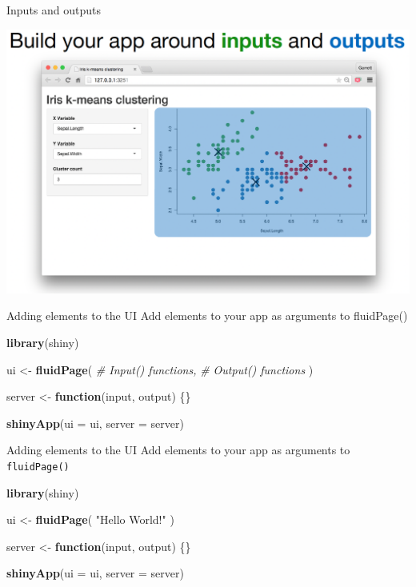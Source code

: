\documentclass[
  ignorenonframetext,
]{beamer}
\newenvironment{Shaded}{\begin{snugshade}}{\end{snugshade}}
\newcommand{\AttributeTok}[1]{\textcolor[rgb]{0.13,0.29,0.53}{#1}}
\newcommand{\CommentTok}[1]{\textcolor[rgb]{0.56,0.35,0.01}{\textit{#1}}}
\newcommand{\ControlFlowTok}[1]{\textcolor[rgb]{0.13,0.29,0.53}{\textbf{#1}}}
\newcommand{\FunctionTok}[1]{\textcolor[rgb]{0.13,0.29,0.53}{\textbf{#1}}}
\newcommand{\NormalTok}[1]{#1}
\newcommand{\OtherTok}[1]{\textcolor[rgb]{0.56,0.35,0.01}{#1}}
\newcommand{\StringTok}[1]{\textcolor[rgb]{0.31,0.60,0.02}{#1}}
\begin{document}
\begin{frame}{Inputs and outputs}
\label{inputs-and-outputs-1}
\center

\includegraphics{shinyfigs/shiny_in_out_1.png}
\end{frame}

\begin{frame}[fragile]{Adding elements to the UI}
\label{adding-elements-to-the-ui}
Add elements to your app as arguments to fluidPage()

\begin{Shaded}
\begin{Highlighting}[]
\FunctionTok{library}\NormalTok{(shiny)}

\NormalTok{ui }\OtherTok{\textless{}{-}} \FunctionTok{fluidPage}\NormalTok{(}
    \CommentTok{\# Input() functions,}
    \CommentTok{\# Output() functions}
\NormalTok{    )}

\NormalTok{server }\OtherTok{\textless{}{-}} \ControlFlowTok{function}\NormalTok{(input, output) \{\}}

\FunctionTok{shinyApp}\NormalTok{(}\AttributeTok{ui =}\NormalTok{ ui, }\AttributeTok{server =}\NormalTok{ server)}
\end{Highlighting}
\end{Shaded}
\end{frame}

\begin{frame}[fragile]{Adding elements to the UI}
\label{adding-elements-to-the-ui-1}
Add elements to your app as arguments to \texttt{fluidPage()}

\begin{Shaded}
\begin{Highlighting}[]
\FunctionTok{library}\NormalTok{(shiny)}

\NormalTok{ui }\OtherTok{\textless{}{-}} \FunctionTok{fluidPage}\NormalTok{(}
  \StringTok{"Hello World!"}
\NormalTok{  )}

\NormalTok{server }\OtherTok{\textless{}{-}} \ControlFlowTok{function}\NormalTok{(input, output) \{\}}

\FunctionTok{shinyApp}\NormalTok{(}\AttributeTok{ui =}\NormalTok{ ui, }\AttributeTok{server =}\NormalTok{ server)}
\end{Highlighting}
\end{Shaded}
\end{frame}
\end{document}
